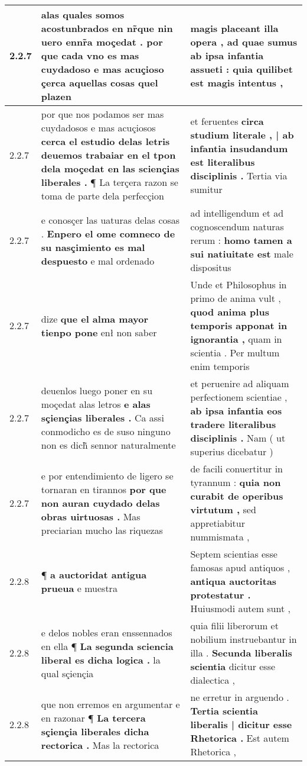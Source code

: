 \begin{tabular}{|p{1cm}|p{6.5cm}|p{6.5cm}|}
2.2.7 & alas quales somos acostunbrados en \textbf{ nr̃que nin uero ennr̃a moçedat . } por que cada vno es mas cuydadoso e mas acuçioso çerca aquellas cosas quel plazen & magis placeant illa opera , \textbf{ ad quae sumus ab ipsa infantia assueti : } quia quilibet est magis intentus , \\\hline
2.2.7 & por que nos podamos ser mas cuydadosos e mas acuçiosos \textbf{ cerca el estudio delas letris deuemos trabaiar en el tpon dela moçedat en las sciençias liberales . } ¶ La terçera razon se toma de parte dela perfecçion & et feruentes \textbf{ circa studium literale , | ab infantia insudandum est literalibus disciplinis . } Tertia via sumitur \\\hline
2.2.7 & e conosçer las uaturas delas cosas . \textbf{ Enpero el ome comneco de su nasçimiento es mal despuesto } e mal ordenado & ad intelligendum et ad cognoscendum naturas rerum : \textbf{ homo tamen a sui natiuitate est } male dispositus \\\hline
2.2.7 & dize \textbf{ que el alma mayor tienpo pone } enł non saber & Unde et Philosophus in primo de anima vult , \textbf{ quod anima plus temporis apponat in ignorantia , } quam in scientia . Per multum enim temporis \\\hline
2.2.7 & deuenlos luego poner en su moçedat alas letros \textbf{ e alas sçiençias liberales . } Ca assi conmodicho es de suso ninguno non es dich̃ sennor naturalmente & et peruenire ad aliquam perfectionem scientiae , \textbf{ ab ipsa infantia eos tradere literalibus disciplinis . } Nam ( ut superius dicebatur ) \\\hline
2.2.7 & e por entendimiento de ligero se tornaran en tirannos \textbf{ por que non auran cuydado delas obras uirtuosas . } Mas preciarian mucho las riquezas & de facili conuertitur in tyrannum : \textbf{ quia non curabit de operibus virtutum , } sed appretiabitur nummismata , \\\hline
2.2.8 & ¶ \textbf{ a auctoridat antigua prueua } e muestra & Septem scientias esse famosas apud antiquos , \textbf{ antiqua auctoritas protestatur . } Huiusmodi autem sunt , \\\hline
2.2.8 & e delos nobles eran enssennados en ella ¶ \textbf{ La segunda sciencia liberal es dicha logica . } la qual sçiençia & quia filii liberorum et nobilium instruebantur in illa . \textbf{ Secunda liberalis scientia } dicitur esse dialectica , \\\hline
2.2.8 & que non erremos en argumentar e en razonar ¶ \textbf{ La tercera sçiençia liberales dicha rectorica . } Mas la rectorica & ne erretur in arguendo . \textbf{ Tertia scientia liberalis | dicitur esse Rhetorica . } Est autem Rhetorica , \\\hline

\end{tabular}
